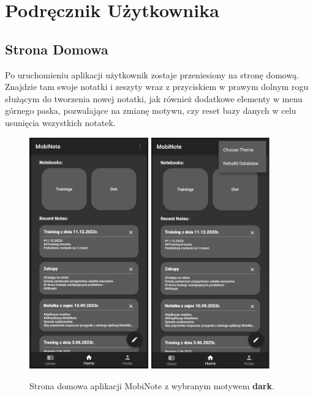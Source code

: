 \chapter{Podręcznik Użytkownika}
\label{ch:manual}

\section{Strona Domowa}

Po uruchomieniu aplikacji użytkownik zostaje przeniesiony na stronę domową. Znajdzie tam swoje notatki i zeszyty wraz z przyciskiem w prawym dolnym rogu służącym do tworzenia nowej notatki, jak również dodatkowe elementy w menu górnego paska, pozwalające na zmianę motywu, czy reset bazy danych w celu usunięcia wszystkich notatek. 

\begin{figure}[ht]
    \centering
    \includegraphics[height=10cm]{images/strona_domowa.png}
    \quad\quad
    \includegraphics[height=10cm]{images/strona_domowa_opcje.png}
    \caption{Strona domowa aplikacji MobiNote z wybranym motywem \textbf{dark}.}
\end{figure}

